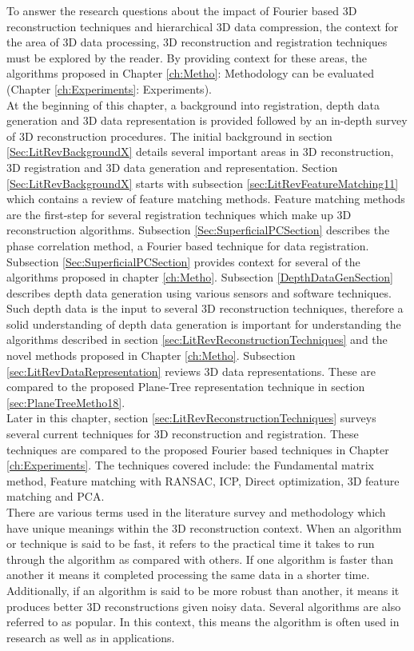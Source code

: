 
To answer the research questions about the impact of Fourier based 3D reconstruction techniques and hierarchical 3D data compression, the context for the area of 3D data processing, 3D reconstruction and registration techniques must be explored by the reader. By providing context for these areas, the algorithms proposed in Chapter \ref{ch:Metho}: Methodology can be evaluated (Chapter \ref{ch:Experiments}: Experiments). \\

At the beginning of this chapter, a background into registration, depth data generation and 3D data representation is provided followed by an in-depth survey of 3D reconstruction procedures. The initial background in section \ref{Sec:LitRevBackgroundX} details several important areas in 3D reconstruction, 3D registration and 3D data generation and representation. Section \ref{Sec:LitRevBackgroundX} starts with subsection \ref{sec:LitRevFeatureMatching11} which contains a review of feature matching methods. Feature matching methods are the first-step for several registration techniques which make up 3D reconstruction algorithms. Subsection \ref{Sec:SuperficialPCSection} describes the phase correlation method, a Fourier based technique for data registration. Subsection \ref{Sec:SuperficialPCSection} provides context for several of the algorithms proposed in chapter \ref{ch:Metho}. Subsection \ref{DepthDataGenSection} describes depth data generation using various sensors and software techniques. Such depth data is the input to several 3D reconstruction techniques, therefore a solid understanding of depth data generation is important for understanding the algorithms described in section \ref{sec:LitRevReconstructionTechniques} and the novel methods proposed in Chapter \ref{ch:Metho}. Subsection \ref{sec:LitRevDataRepresentation} reviews 3D data representations. These are compared to the proposed Plane-Tree representation technique in section \ref{sec:PlaneTreeMetho18}. \\

Later in this chapter, section \ref{sec:LitRevReconstructionTechniques} surveys several current techniques for 3D reconstruction and registration. These techniques are compared to the proposed Fourier based techniques in Chapter \ref{ch:Experiments}. The techniques covered include: the Fundamental matrix method, Feature matching with RANSAC, ICP, Direct optimization, 3D feature matching and PCA. \\

There are various terms used in the literature survey and methodology which have unique meanings within the 3D reconstruction context. When an algorithm or technique is said to be fast, it refers to the practical time it takes to run through the algorithm as compared with others. If one algorithm is faster than another it means it completed processing the same data in a shorter time. Additionally, if an algorithm is said to be more robust than another, it means it produces better 3D reconstructions given noisy data. Several algorithms are also referred to as popular. In this context, this means the algorithm is often used in research as well as in applications. \\



